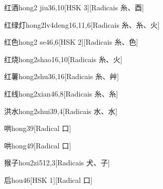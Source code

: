 \begin{entry}{红酒}{hong2 jiu3}{6,10}[HSK 3][Radicais ⽷、⾣]
\end{entry}

\begin{entry}{红绿灯}{hong2lv4deng1}{6,11,6}[Radicais ⽷、⽷、⽕]
\end{entry}

\begin{entry}{红色}{hong2 se4}{6,6}[HSK 2][Radicais ⽷、⾊]
\end{entry}

\begin{entry}{红烧}{hong2shao1}{6,10}[Radicais ⽷、⽕]
\end{entry}

\begin{entry}{红薯}{hong2shu3}{6,16}[Radicais ⽷、⾋]
\end{entry}

\begin{entry}{红线}{hong2xian4}{6,8}[Radicais ⽷、⽷]
\end{entry}

\begin{entry}{洪水}{hong2shui3}{9,4}[Radicais ⽔、⽔]
\end{entry}

\begin{entry}{哄}{hong3}{9}[Radical ⼝]
\end{entry}

\begin{entry}{哄}{hong4}{9}[Radical ⼝]
\end{entry}

\begin{entry}{猴子}{hou2zi5}{12,3}[Radicais ⽝、⼦]
\end{entry}

\begin{entry}{后}{hou4}{6}[HSK 1][Radical ⼝]
\end{entry}

